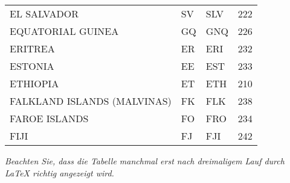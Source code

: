 \begin{footnotesize}
\begin{longtable}[c]{ p{} p{} p{} p{}}
    EL SALVADOR                                    & SV & SLV & 222 \\
    EQUATORIAL GUINEA                              & GQ & GNQ & 226 \\
    ERITREA                                        & ER & ERI & 232 \\
    ESTONIA                                        & EE & EST & 233 \\
    ETHIOPIA                                       & ET & ETH & 210 \\
    FALKLAND ISLANDS (MALVINAS)                    & FK & FLK & 238 \\
    FAROE ISLANDS                                  & FO & FRO & 234 \\
    FIJI                                           & FJ & FJI & 242 \\
    \bottomrule
  \end{longtable}
\end{footnotesize}
\rmfamily


\textit{Beachten Sie, dass die Tabelle manchmal erst nach dreimaligem Lauf durch \LaTeX{} richtig angezeigt wird.}

